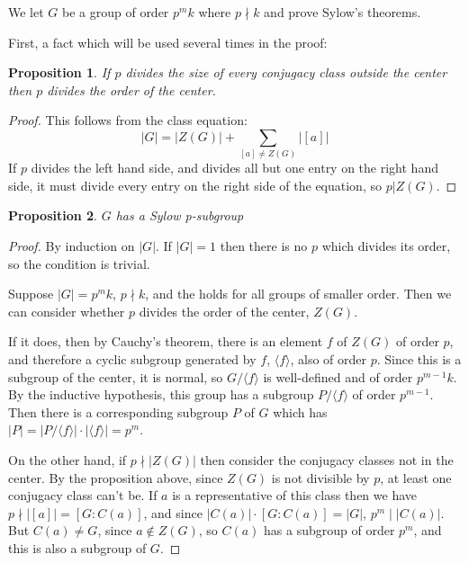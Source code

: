 \documentclass[12pt]{article}
\newtheorem{proposition}{Proposition}
\begin{document}
We let $G$ be a group of order $p^mk$ where $p\nmid k$ and prove Sylow's theorems.

First, a fact which will be used several times in the proof:

\begin{proposition}
If $p$ divides the size of every conjugacy class outside the center then $p$ divides the order of the center.
\end{proposition}

\begin{proof} This follows from the class equation:
\begin{displaymath}
|G|=|Z(G)|+\sum_{[a]\neq Z(G)} |[a]|
\end{displaymath}
If $p$ divides the left hand side, and divides all but one entry on the right hand side, it must divide every entry on the right side of the equation, so $p|Z(G)$.
\end{proof}

\begin{proposition}
$G$ has a Sylow p-subgroup
\end{proposition}

\begin{proof} By induction on $|G|$.  If $|G|=1$ then there is no $p$ which divides its order, so the condition is trivial.

Suppose $|G|=p^mk$, $p\nmid k$, and the  holds for all groups of smaller order.  Then we can consider whether $p$ divides the order of the center, $Z(G)$.

If it does, then by Cauchy's theorem, there is an element $f$ of $Z(G)$ of order $p$, and therefore a cyclic subgroup generated by $f$, $\langle f\rangle$, also of order $p$.  Since this is a subgroup of the center, it is normal, so $G/\langle f\rangle$ is well-defined and of order $p^{m-1}k$.  By the inductive hypothesis, this group has a subgroup $P/\langle f\rangle$ of order $p^{m-1}$.  Then there is a corresponding subgroup $P$ of $G$ which has $|P|=|P/\langle f\rangle|\cdot|\langle f\rangle|=p^m$.


On the other hand, if $p\nmid |Z(G)|$ then consider the conjugacy classes not in the center.  By the proposition above, since $Z(G)$ is not divisible by $p$, at least one conjugacy class can't be.  If $a$ is a representative of this class then we have $p\nmid |[a]|=[G:C(a)]$, and since $|C(a)|\cdot[G:C(a)]=|G|$, $p^m\mid |C(a)|$.  But $C(a)\neq G$, since $a\notin Z(G)$, so $C(a)$ has a subgroup of order $p^m$, and this is also a subgroup of $G$.
\end{proof}
\end{document}
